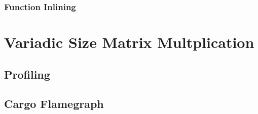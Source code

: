 \subsubsection{Function Inlining}
\section{Variadic Size Matrix Multplication}
\subsection{Profiling}
\subsection{Cargo Flamegraph}
